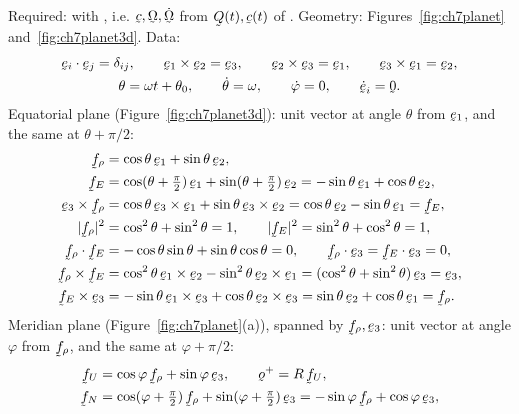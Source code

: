 \begin{solution}
Required:  with , i.e. $\bc,\bOm,\dot\bOm$ from
$\bQ(t),\bc(t)$ of . Geometry: Figures~\ref{fig:ch7planet}
and~\ref{fig:ch7planet3d}. Data:
\begin{gather*}
   \ip{\be_{i}}{\be_{j}}=\dd_{ij},\qquad
   \be_{1}\times\be_{2}=\be_{3},\qquad \be_{2}\times\be_{3}=\be_{1},\qquad
   \be_{3}\times\be_{1}=\be_{2},\\
   \theta=\omega t+\theta_{0},\qquad \dot\theta=\omega,\qquad
   \dot\varphi=0,\qquad \dot\be_{i}=\bze .
\end{gather*}
Equatorial plane (Figure~\ref{fig:ch7planet3d}): unit vector at angle
$\theta$ from $\be_{1}$, and the same at $\theta+\pi/2$:
\begin{align*}
   \bff_{\rho}&=\cos\theta\,\be_{1}+\sin\theta\,\be_{2},\\
   \bff_{E}&=\cos(\theta+\tfrac{\pi}{2})\,\be_{1}
            +\sin(\theta+\tfrac{\pi}{2})\,\be_{2}
           =-\sin\theta\,\be_{1}+\cos\theta\,\be_{2},\\
   \be_{3}\times\bff_{\rho}
     &=\cos\theta\,\be_{3}\times\be_{1}+\sin\theta\,\be_{3}\times\be_{2}
      =\cos\theta\,\be_{2}-\sin\theta\,\be_{1}=\bff_{E},\\
   |\bff_{\rho}|^{2}&=\cos^{2}\theta+\sin^{2}\theta=1,\qquad
   |\bff_{E}|^{2}=\sin^{2}\theta+\cos^{2}\theta=1,\\
   \ip{\bff_{\rho}}{\bff_{E}}
     &=-\cos\theta\sin\theta+\sin\theta\cos\theta=0,\qquad
   \ip{\bff_{\rho}}{\be_{3}}=\ip{\bff_{E}}{\be_{3}}=0,\\
   \bff_{\rho}\times\bff_{E}
     &=\cos^{2}\theta\,\be_{1}\times\be_{2}
       -\sin^{2}\theta\,\be_{2}\times\be_{1}
      =(\cos^{2}\theta+\sin^{2}\theta)\,\be_{3}=\be_{3},\\
   \bff_{E}\times\be_{3}
     &=-\sin\theta\,\be_{1}\times\be_{3}+\cos\theta\,\be_{2}\times\be_{3}
      =\sin\theta\,\be_{2}+\cos\theta\,\be_{1}=\bff_{\rho}.
\end{align*}
Meridian plane (Figure~\ref{fig:ch7planet}(a)), spanned by
$\bff_{\rho},\be_{3}$: unit vector at angle $\varphi$ from
$\bff_{\rho}$, and the same at $\varphi+\pi/2$:
\begin{align*}
   \bff_{U}&=\cos\varphi\,\bff_{\rho}+\sin\varphi\,\be_{3},
   \qquad \bo^{+}=R\,\bff_{U},\\
   \bff_{N}&=\cos(\varphi+\tfrac{\pi}{2})\,\bff_{\rho}
            +\sin(\varphi+\tfrac{\pi}{2})\,\be_{3}
           =-\sin\varphi\,\bff_{\rho}+\cos\varphi\,\be_{3},\\

\end{align*}
\end{solution}
